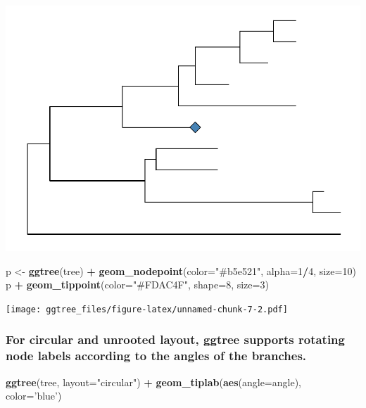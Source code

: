 \documentclass[]{article}
\newenvironment{Shaded}{\begin{snugshade}}{\end{snugshade}}
\newcommand{\KeywordTok}[1]{\textcolor[rgb]{0.13,0.29,0.53}{\textbf{#1}}}
\newcommand{\DataTypeTok}[1]{\textcolor[rgb]{0.13,0.29,0.53}{#1}}
\newcommand{\DecValTok}[1]{\textcolor[rgb]{0.00,0.00,0.81}{#1}}
\newcommand{\StringTok}[1]{\textcolor[rgb]{0.31,0.60,0.02}{#1}}
\newcommand{\OperatorTok}[1]{\textcolor[rgb]{0.81,0.36,0.00}{\textbf{#1}}}
\newcommand{\NormalTok}[1]{#1}
\begin{document}
\includegraphics{ggtree_files/figure-latex/unnamed-chunk-7-1.pdf}

\begin{Shaded}
\begin{Highlighting}[]
\NormalTok{p <-}\StringTok{ }\KeywordTok{ggtree}\NormalTok{(tree) }\OperatorTok{+}\StringTok{ }\KeywordTok{geom_nodepoint}\NormalTok{(}\DataTypeTok{color=}\StringTok{"#b5e521"}\NormalTok{, }\DataTypeTok{alpha=}\DecValTok{1}\OperatorTok{/}\DecValTok{4}\NormalTok{, }\DataTypeTok{size=}\DecValTok{10}\NormalTok{)}
\NormalTok{p }\OperatorTok{+}\StringTok{ }\KeywordTok{geom_tippoint}\NormalTok{(}\DataTypeTok{color=}\StringTok{"#FDAC4F"}\NormalTok{, }\DataTypeTok{shape=}\DecValTok{8}\NormalTok{, }\DataTypeTok{size=}\DecValTok{3}\NormalTok{)}
\end{Highlighting}
\end{Shaded}

\texttt{[image: ggtree\_files/figure-latex/unnamed-chunk-7-2.pdf]}

\subsubsection{For circular and unrooted layout, ggtree supports
rotating node labels according to the angles of the
branches.}\label{for-circular-and-unrooted-layout-ggtree-supports-rotating-node-labels-according-to-the-angles-of-the-branches.}

\begin{Shaded}
\begin{Highlighting}[]
\KeywordTok{ggtree}\NormalTok{(tree, }\DataTypeTok{layout=}\StringTok{"circular"}\NormalTok{) }\OperatorTok{+}\StringTok{ }\KeywordTok{geom_tiplab}\NormalTok{(}\KeywordTok{aes}\NormalTok{(}\DataTypeTok{angle=}\NormalTok{angle), }\DataTypeTok{color=}\StringTok{'blue'}\NormalTok{)}
\end{Highlighting}
\end{Shaded}
\end{document}
